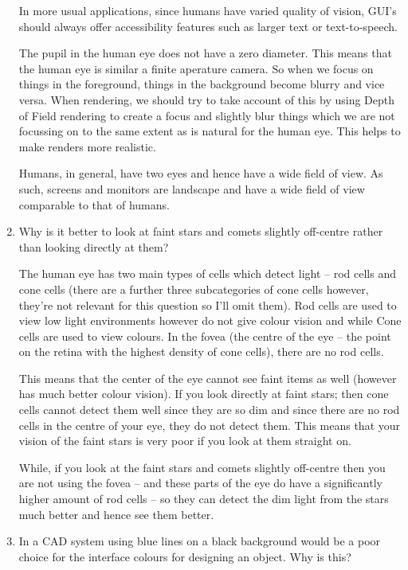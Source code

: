 \documentclass[10pt,\jkfside,a4paper]{article}
\begin{document}
\begin{enumerate}[label=(\alph*)]
In more usual applications, since humans have varied quality of vision, GUI's 
should always offer accessibility features such as larger text or text-to-speech.

The pupil in the human eye does not have a zero diameter. This means that the human eye 
is similar a finite aperature camera. So when we focus on things in the foreground, things in 
the background become blurry and vice versa. When rendering, we should try to take account 
of this by using Depth of Field rendering to create a focus and slightly blur things which 
we are not focussing on to the same extent as is natural for the human eye. This helps to 
make renders more realistic.

Humans, in general, have two eyes and hence have a wide field of view. As such, screens 
and monitors are landscape and have a wide field of view comparable to that of humans.

\item Why is it better to look at faint stars and comets slightly off-centre rather 
than looking directly at them?

The human eye has two main types of cells which detect light -- rod cells and cone cells 
(there are a further three subcategories of cone cells however, they're not relevant for 
this question so I'll omit them). Rod cells are used to view low light environments however do 
not give colour vision and while Cone cells are used to view colours. In the fovea (the centre 
of the eye -- the point on the retina with the highest density of cone cells), there are no rod cells.

This means that the center of the eye cannot see faint items as well (however has much better 
colour vision). If you look directly at faint stars; then cone cells cannot detect them well since 
they are so dim and since there are no rod cells in the centre of your eye, they do not detect them. 
This means that your vision of the faint stars is very poor if you look at them straight on.

While, if you look at the faint stars and comets slightly off-centre then you are not using the fovea -- 
and these parts of the eye do have a significantly higher amount of rod cells -- so they can detect 
the dim light from the stars much better and hence see them better.

\item In a CAD system using blue lines on a black background would be a poor choice for 
the interface colours for designing an object. Why is this?


\end{enumerate}
\end{document}
